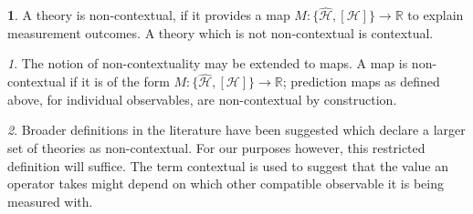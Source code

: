 \documentclass[british,aps,prl,superscriptaddress,nofootinbib,times,reprint]{revtex4-1}
\theoremstyle{plain}
\theoremstyle{plain}
\theoremstyle{definition}
\newtheorem{defn}{\protect\definitionname}
\theoremstyle{remark}
\theoremstyle{remark}
\newtheorem{defnrem}{\protect\remarkname}[defn]
\theoremstyle{remark}
\theoremstyle{plain}
\theoremstyle{plain}
\theoremstyle{plain}
\theoremstyle{definition}
\theoremstyle{definition}
\providecommand{\definitionname}{Definition}
\providecommand{\remarkname}{Remark}
\begin{document}
\begin{defn} A theory is non-contextual, if it
provides a map $M: \{
\hat{\mathcal{H}},[\mathcal{H}] \} \to\mathbb{R}$
to explain measurement outcomes. A theory which is
not non-contextual is contextual.\end{defn}


\begin{defnrem} The notion of non-contextuality may be
extended to maps. A map is non-contextual if it is
of the form $M: \{ \hat{\mathcal{H}},[\mathcal{H}]
\} \to\mathbb{R}$; prediction maps as defined above, for individual observables, are non-contextual by construction.  
\end{defnrem}
\begin{defnrem}
Broader definitions in the literature have been
suggested which declare a larger set of theories
as non-contextual. For our purposes however, this
restricted definition will suffice. The term
contextual is used to suggest that the value an
operator takes might depend on which other
compatible observable it is being  measured with.
\end{defnrem}
\end{document}
